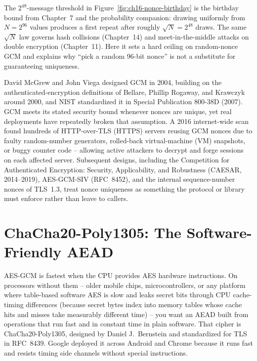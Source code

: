 \begin{connectionbox}
The $2^{48}$-message threshold in Figure~\ref{fig:ch16-nonce-birthday} is the birthday bound from Chapter~7 and the probability companion: drawing uniformly from $N = 2^{96}$ values produces a first repeat after roughly $\sqrt{N} = 2^{48}$ draws. The same $\sqrt{N}$ law governs hash collisions (Chapter~14) and meet-in-the-middle attacks on double encryption (Chapter~11). Here it sets a hard ceiling on random-nonce GCM and explains why ``pick a random 96-bit nonce'' is not a substitute for guaranteeing uniqueness.
\end{connectionbox}

\begin{historybox}
David McGrew and John Viega designed GCM in 2004, building on the authenticated-encryption definitions of Bellare, Phillip Rogaway, and Krawczyk around 2000, and NIST standardized it in Special Publication 800-38D (2007). GCM meets its stated security bound whenever nonces are unique, yet real deployments have repeatedly broken that assumption. A 2016 internet-wide scan found hundreds of HTTP-over-TLS (HTTPS) servers reusing GCM nonces due to faulty random-number generators, rolled-back virtual-machine (VM) snapshots, or buggy counter code -- allowing active attackers to decrypt and forge sessions on each affected server. Subsequent designs, including the Competition for Authenticated Encryption: Security, Applicability, and Robustness (CAESAR, 2014--2019), AES-GCM-SIV (RFC~8452), and the internal sequence-number nonces of TLS~1.3, treat nonce uniqueness as something the protocol or library must enforce rather than leave to callers.
\end{historybox}

\section{ChaCha20-Poly1305: The Software-Friendly AEAD}
\label{ch16:chacha-poly}

AES-GCM is fastest when the CPU provides AES hardware instructions. On processors without them -- older mobile chips, microcontrollers, or any platform where table-based software AES is slow and leaks secret bits through CPU cache-timing differences (because secret bytes index into memory tables whose cache hits and misses take measurably different time) -- you want an AEAD built from operations that run fast and in constant time in plain software. That cipher is ChaCha20-Poly1305, designed by Daniel J.\ Bernstein and standardized for TLS in RFC~8439. Google deployed it across Android and Chrome because it runs fast and resists timing side channels without special instructions.


